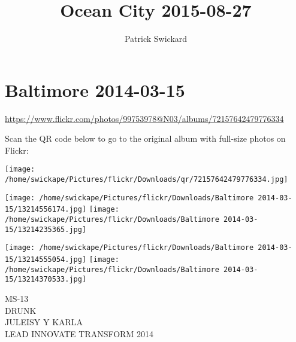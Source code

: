 \documentclass[10pt,letterpaper]{article}
\title{Ocean City 2015-08-27}
\author{Patrick Swickard}
\date{}
\begin{document}
\section*{Baltimore 2014-03-15}

\url{https://www.flickr.com/photos/99753978@N03/albums/72157642479776334}

Scan the QR code below to go to the original album with full-size photos on Flickr:

\texttt{[image: /home/swickape/Pictures/flickr/Downloads/qr/72157642479776334.jpg]}
\pagebreak

\texttt{[image: /home/swickape/Pictures/flickr/Downloads/Baltimore 2014-03-15/13214556174.jpg]}
\texttt{[image: /home/swickape/Pictures/flickr/Downloads/Baltimore 2014-03-15/13214235365.jpg]}

\texttt{[image: /home/swickape/Pictures/flickr/Downloads/Baltimore 2014-03-15/13214555054.jpg]}
\texttt{[image: /home/swickape/Pictures/flickr/Downloads/Baltimore 2014-03-15/13214370533.jpg]}

MS{-}13\\
DRUNK\\
JULEISY Y KARLA\\
LEAD INNOVATE TRANSFORM 2014
\pagebreak
\end{document}
